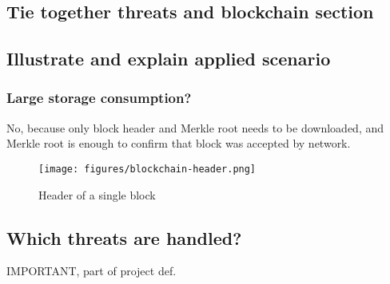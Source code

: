 
\subsection{Tie together threats and blockchain section}

\subsection{Illustrate and explain applied scenario}

\subsubsection{Large storage consumption?}
No, because only block header and Merkle root needs to be downloaded,
and Merkle root is enough to confirm that block was accepted by
network.

\begin{figure}[ht]
  \centering
  \texttt{[image: figures/blockchain-header.png]}
  \caption{\label{fig:blockchain-header} Header of a single block}
\end{figure}


\subsection{Which threats are handled?}
IMPORTANT, part of project def.
